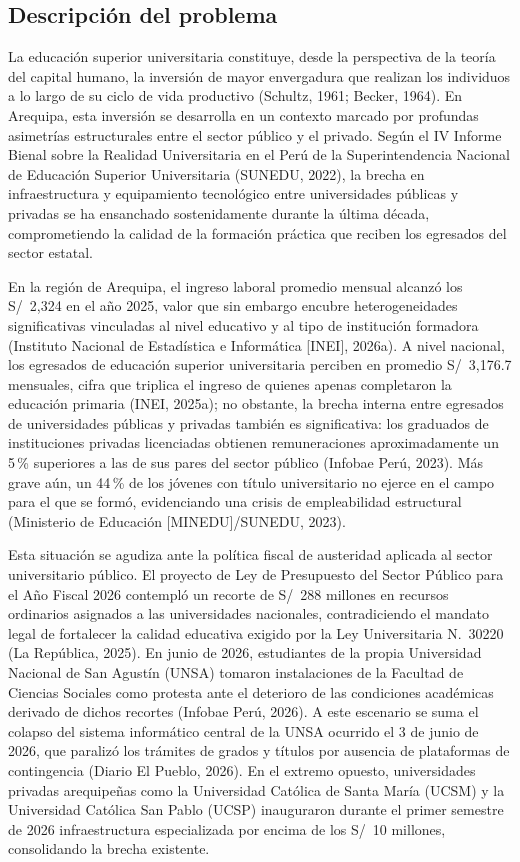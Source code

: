 \documentclass[11pt, a4paper]{article}
\begin{document}
\subsection{Descripción del problema}

La educación superior universitaria constituye, desde la perspectiva de la teoría del capital humano, la inversión de mayor envergadura que realizan los individuos a lo largo de su ciclo de vida productivo (Schultz, 1961; Becker, 1964). En Arequipa, esta inversión se desarrolla en un contexto marcado por profundas asimetrías estructurales entre el sector público y el privado. Según el IV Informe Bienal sobre la Realidad Universitaria en el Perú de la Superintendencia Nacional de Educación Superior Universitaria (SUNEDU, 2022), la brecha en infraestructura y equipamiento tecnológico entre universidades públicas y privadas se ha ensanchado sostenidamente durante la última década, comprometiendo la calidad de la formación práctica que reciben los egresados del sector estatal.

En la región de Arequipa, el ingreso laboral promedio mensual alcanzó los S/~2{,}324 en el año 2025, valor que sin embargo encubre heterogeneidades significativas vinculadas al nivel educativo y al tipo de institución formadora (Instituto Nacional de Estadística e Informática [INEI], 2026a). A nivel nacional, los egresados de educación superior universitaria perciben en promedio S/~3{,}176.7 mensuales, cifra que triplica el ingreso de quienes apenas completaron la educación primaria (INEI, 2025a); no obstante, la brecha interna entre egresados de universidades públicas y privadas también es significativa: los graduados de instituciones privadas licenciadas obtienen remuneraciones aproximadamente un 5\,\% superiores a las de sus pares del sector público (Infobae Perú, 2023). Más grave aún, un 44\,\% de los jóvenes con título universitario no ejerce en el campo para el que se formó, evidenciando una crisis de empleabilidad estructural (Ministerio de Educación [MINEDU]/SUNEDU, 2023).

Esta situación se agudiza ante la política fiscal de austeridad aplicada al sector universitario público. El proyecto de Ley de Presupuesto del Sector Público para el Año Fiscal 2026 contempló un recorte de S/~288 millones en recursos ordinarios asignados a las universidades nacionales, contradiciendo el mandato legal de fortalecer la calidad educativa exigido por la Ley Universitaria N.\textdegree~30220 (La República, 2025). En junio de 2026, estudiantes de la propia Universidad Nacional de San Agustín (UNSA) tomaron instalaciones de la Facultad de Ciencias Sociales como protesta ante el deterioro de las condiciones académicas derivado de dichos recortes (Infobae Perú, 2026). A este escenario se suma el colapso del sistema informático central de la UNSA ocurrido el 3 de junio de 2026, que paralizó los trámites de grados y títulos por ausencia de plataformas de contingencia (Diario El Pueblo, 2026). En el extremo opuesto, universidades privadas arequipeñas como la Universidad Católica de Santa María (UCSM) y la Universidad Católica San Pablo (UCSP) inauguraron durante el primer semestre de 2026 infraestructura especializada por encima de los S/~10 millones, consolidando la brecha existente.
\end{document}
